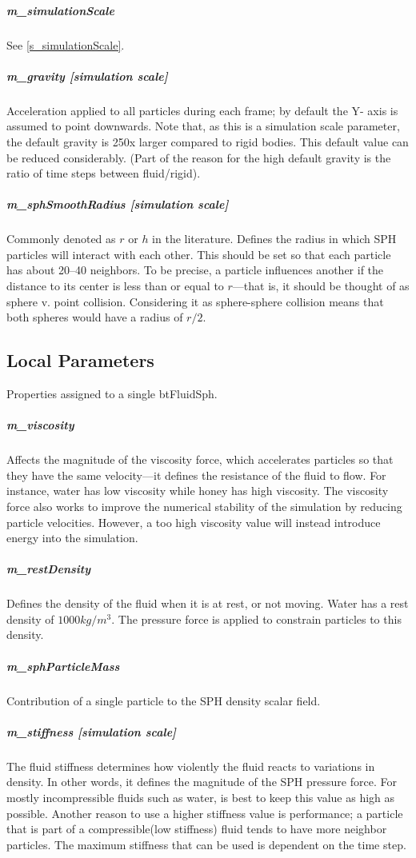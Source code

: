 \documentclass[]{article}
\begin{document}
		\subparagraph{m\_simulationScale}
			See \ref{s_simulationScale}.
		
		\subparagraph{m\_gravity [simulation scale] }
			Acceleration applied to all particles during each frame; by default the Y- axis is assumed to point downwards.
			Note that, as this is a simulation scale parameter, the default gravity is 250x larger compared to rigid bodies. 
			This default value can be reduced considerably. (Part of the reason for the high default gravity is the ratio of 
			time steps between fluid/rigid).
		
		\subparagraph{m\_sphSmoothRadius [simulation scale]}
			Commonly denoted as \(r\) or \(h\) in the literature. Defines the radius in which SPH particles will 
			interact with each other. This should be set so that each particle has about 20--40 neighbors. To be precise, 
			a particle influences another if the distance to its center is less than or equal to \(r\)---that is, it 
			should be thought of as sphere v. point collision. Considering it as sphere-sphere collision means that both
			spheres would have a radius of \(r/2\).
		
	\subsection{Local Parameters}
		Properties assigned to a single btFluidSph.

		\subparagraph{m\_viscosity}
			Affects the magnitude of the viscosity force, which accelerates particles so that they have the
			same velocity---it defines the resistance of the fluid to flow. For instance, water has low viscosity while 
			honey has high viscosity. The viscosity force also works to improve the numerical stability of the simulation
			by reducing particle velocities. However, a too high viscosity value will instead introduce energy into the 
			simulation.
		
		\subparagraph{m\_restDensity}
			Defines the density of the fluid when it is at rest, or not moving. Water has a rest density
			of \(1000 kg / m^3\). The pressure force is applied to constrain particles to this density.
			
		\subparagraph{m\_sphParticleMass}
			Contribution of a single particle to the SPH density scalar field.
			
		\subparagraph{m\_stiffness [simulation scale]}
			The fluid stiffness determines how violently the fluid reacts to variations in density. In other words, it
			defines the magnitude of the SPH pressure force. For mostly incompressible fluids such as water, is best to
			keep this value as high as possible. Another reason to use a higher stiffness value is performance; a particle
			that is part of a compressible(low stiffness) fluid tends to have more neighbor particles. The maximum stiffness
			that can be used is dependent on the time step.
		
\end{document}
